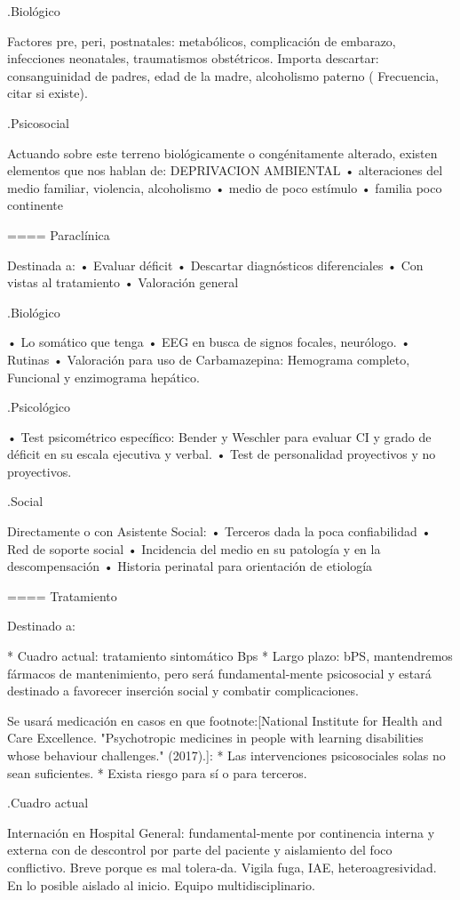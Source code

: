 \documentclass[encares.tex]{subfiles}
\begin{document}
.Biológico

Factores pre, peri, postnatales: metabólicos, complicación de embarazo, infecciones neonatales, traumatismos obstétricos. Importa descartar: consanguinidad de padres, edad de la madre, alcoholismo paterno ( Frecuencia, citar si existe).

.Psicosocial

Actuando sobre este terreno biológicamente o congénitamente alterado, existen elementos que nos hablan de: DEPRIVACION AMBIENTAL • alteraciones del medio familiar, violencia, alcoholismo • medio de poco estímulo • familia poco continente

==== Paraclínica

Destinada a: • Evaluar déficit • Descartar diagnósticos diferenciales • Con vistas al tratamiento • Valoración general

.Biológico

• Lo somático que tenga • EEG en busca de signos focales, neurólogo. • Rutinas • Valoración para uso de Carbamazepina: Hemograma completo, Funcional y enzimograma hepático.

.Psicológico

• Test psicométrico específico: Bender y Weschler para evaluar CI y grado de déficit en su escala ejecutiva y verbal. • Test de personalidad proyectivos y no proyectivos.

.Social

Directamente o con Asistente Social: • Terceros dada la poca confiabilidad • Red de soporte social • Incidencia del medio en su patología y en la descompensación • Historia perinatal para orientación de etiología

==== Tratamiento

Destinado a:

* Cuadro actual: tratamiento sintomático Bps
* Largo plazo: bPS, mantendremos fármacos de mantenimiento, pero será fundamental-mente psicosocial y estará destinado a favorecer inserción social y combatir complicaciones.

Se usará medicación en casos en que footnote:[National Institute for Health and Care Excellence. "Psychotropic medicines in people with learning disabilities whose behaviour challenges." (2017).]:
* Las intervenciones psicosociales solas no sean suficientes.
* Exista riesgo para sí o para terceros.

.Cuadro actual

Internación en Hospital General: fundamental-mente por continencia interna y externa con de descontrol por parte del paciente y aislamiento del foco conflictivo. Breve porque es mal tolera-da. Vigila fuga, IAE, heteroagresividad. En lo posible aislado al inicio. Equipo multidisciplinario.
\end{document}
